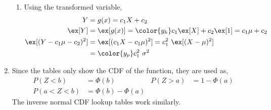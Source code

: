 \begin{enumerate}
\begin{enumerate}
              \item Using the transformed variable,
                    \begin{align}
                        Y      & = g(x) = c_1X + c_2                                 \\
                        \ex[Y] & = \ex[g(x)] = \color{y_h} c_1\ex[X] + c_2\ex[1]
                        = c_1 \mu + c_2                                              \\
                        \ex[(Y - c_1\mu - c_2)^2]
                               & = \ex[(c_1X - c_1 \mu)^2] = c_1^2\ \ex[(X - \mu)^2] \\
                               & = \color{y_p} c_1^2\ \sigma^2
                    \end{align}
          \end{enumerate}

    \item Since the tables only show the CDF of the function, they are used as,
          \begin{align}
              P(Z < b)     & = \Phi(b)           & P(Z > a) & = 1 - \Phi(a) \\
              P(a < Z < b) & = \Phi(b) - \Phi(a)
          \end{align}
          The inverse normal CDF lookup tables work similarly.
\end{enumerate}